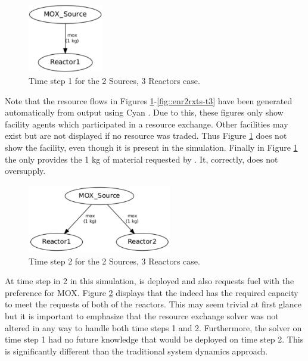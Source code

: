 \begin{figure}[ht!]
  \begin{center}
    \includegraphics[height=3cm]{./figs/2_Sources_3_Reactors-t1.pdf}
    \caption[]{\label{fig::2srcs3rxts-t1}Time step 1 for the 2 Sources, 3 Reactors 
        case.}
  \end{center}
\end{figure}

Note that the resource flows in Figures 
\ref{fig::2srcs3rxts-t1}-\ref{fig::enr2rxts-t3}
have been generated automatically from \Cyclus{} output using
Cyan \cite{Carlsen2014}.  Due to this, these figures only show facility agents
which participated in a resource exchange. Other facilities may exist but are
not displayed if no resource was traded.  Thus Figure \ref{fig::2srcs3rxts-t1}
does not show the \UOXSource{} facility, even though it is present in the
simulation.  Finally in Figure \ref{fig::2srcs3rxts-t1} the \MOXSource{} only
provides the 1 kg of material requested by .  It, correctly, does not
oversupply.

\begin{figure}[ht!]
  \begin{center}
    \includegraphics[height=3cm]{./figs/2_Sources_3_Reactors-t2.pdf}
    \caption[]{\label{fig::2srcs3rxts-t2}Time step 2 for the 2 Sources, 3 Reactors 
        case.}
  \end{center}
\end{figure}

At time step in 2 in this simulation,  is deployed and also requests 
fuel with the preference for MOX.  Figure \ref{fig::2srcs3rxts-t2} displays
that the \MOXSource{} indeed has the required capacity to meet the requests of 
both of the reactors.  This may seem trivial at first glance but it is important 
to emphasize that the resource exchange solver was not altered in any way to handle 
both time steps 1 and 2.  Furthermore, the solver on time step 1 had no future 
knowledge that  would be deployed on time step 2.  This is significantly 
different than the traditional system dynamics approach.

